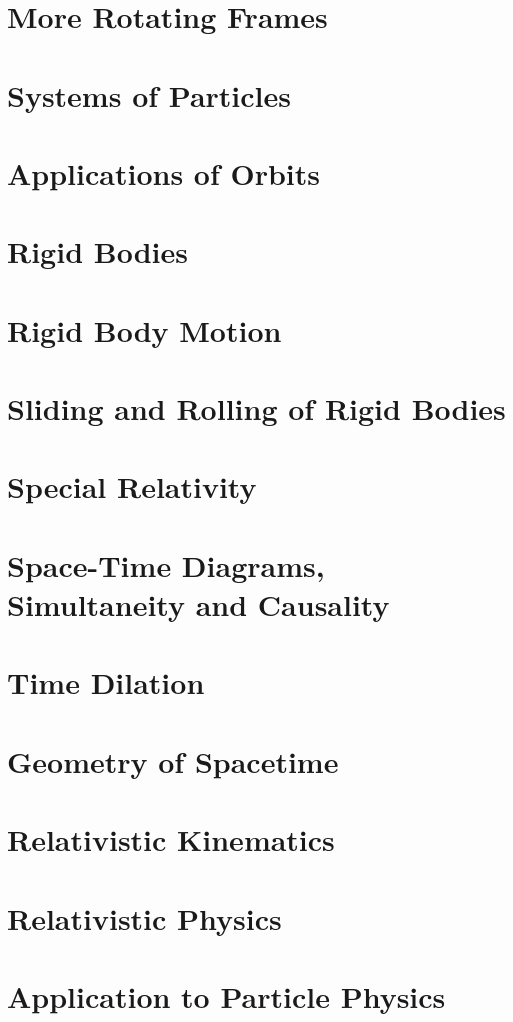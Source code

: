 \documentclass{article}
\begin{document}
\section{More Rotating Frames}

\section{Systems of Particles}

\section{Applications of Orbits}

\section{Rigid Bodies}

\section{Rigid Body Motion}

\section{Sliding and Rolling of Rigid Bodies}

\section{Special Relativity}

\section{Space-Time Diagrams, Simultaneity and Causality}

\section{Time Dilation}

\section{Geometry of Spacetime}

\section{Relativistic Kinematics}

\section{Relativistic Physics}

\section{Application to Particle Physics}

\end{document}
